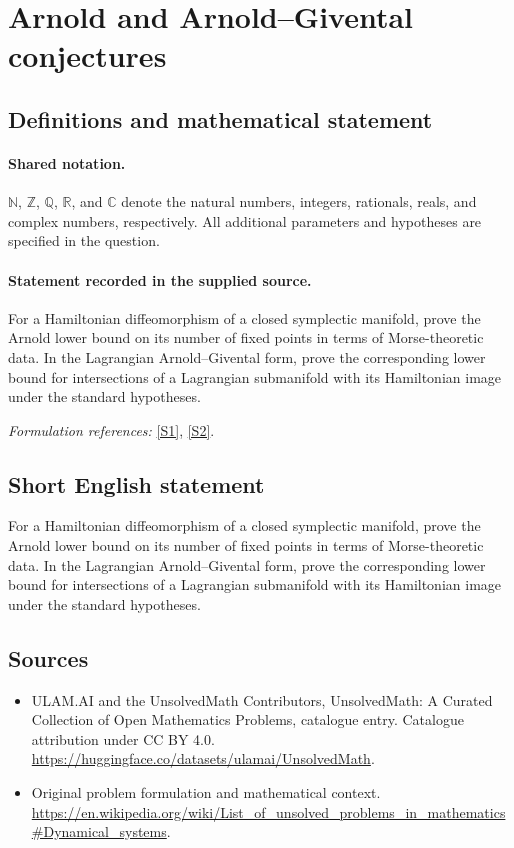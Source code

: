 \documentclass[11pt]{article}
\newcommand{\sref}[2]{\hyperlink{source:#1:#2}{[S#2]}}
\begin{document}
\section{Arnold and Arnold–Givental conjectures}\label{statement}

\subsection{Definitions and mathematical statement}

\paragraph{Shared notation.}$\mathbb N$, $\mathbb Z$, $\mathbb Q$, $\mathbb R$, and $\mathbb C$ denote the natural numbers, integers, rationals, reals, and complex numbers, respectively. All additional parameters and hypotheses are specified in the question.


\paragraph{Statement recorded in the supplied source.}
For a Hamiltonian diffeomorphism of a closed symplectic manifold, prove the Arnold lower bound on its number of fixed points in terms of Morse-theoretic data. In the Lagrangian Arnold–Givental form, prove the corresponding lower bound for intersections of a Lagrangian submanifold with its Hamiltonian image under the standard hypotheses.
\par\smallskip\textit{Formulation references:} \sref{statement}{1}, \sref{statement}{2}.
\subsection{Short English statement}
For a Hamiltonian diffeomorphism of a closed symplectic manifold, prove the Arnold lower bound on its number of fixed points in terms of Morse-theoretic data. In the Lagrangian Arnold–Givental form, prove the corresponding lower bound for intersections of a Lagrangian submanifold with its Hamiltonian image under the standard hypotheses.
\subsection{Sources}
\begin{itemize}
\item[\hypertarget{source:statement:1}{S1}] ULAM.AI and the UnsolvedMath Contributors, UnsolvedMath: A Curated Collection of Open Mathematics Problems, catalogue entry. Catalogue attribution under CC BY 4.0.
\url{https://huggingface.co/datasets/ulamai/UnsolvedMath}.
\item[\hypertarget{source:statement:2}{S2}] Original problem formulation and mathematical context.
\url{https://en.wikipedia.org/wiki/List_of_unsolved_problems_in_mathematics#Dynamical_systems}.
\end{itemize}
\label{end:statement}
\end{document}
